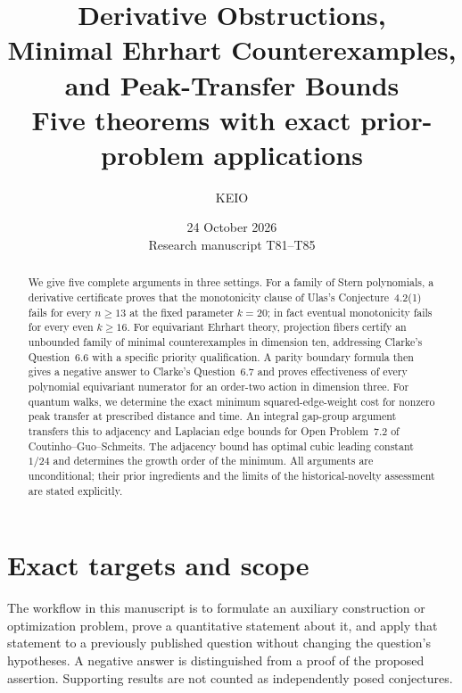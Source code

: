 \documentclass[11pt,a4paper]{article}
\title{Derivative Obstructions,\\Minimal Ehrhart Counterexamples,\\and Peak-Transfer Bounds\\[5pt]\large Five theorems with exact prior-problem applications}
\author{KEIO}
\date{24 October 2026\\[3pt]\small Research manuscript T81--T85}
\theoremstyle{definition}\newtheorem{definition}[lemma]{Definition}
\theoremstyle{remark}\newtheorem{remark}[lemma]{Remark}
\begin{document}
\maketitle
\begin{abstract}
We give five complete arguments in three settings. For a family of Stern
polynomials, a derivative certificate proves that the monotonicity clause
of Ulas's Conjecture~4.2(1) fails for every $n\geq13$ at the fixed parameter
$k=20$; in fact eventual monotonicity fails for every even $k\geq16$.
For equivariant Ehrhart theory, projection fibers certify an unbounded
family of minimal counterexamples in dimension ten, addressing Clarke's
Question~6.6 with a specific priority qualification. A parity boundary
formula then gives a negative answer to Clarke's Question~6.7 and proves
effectiveness of every polynomial equivariant numerator for an order-two
action in dimension three.
For quantum walks, we determine the exact minimum squared-edge-weight
cost for nonzero peak transfer at prescribed distance and time. An integral
gap-group argument transfers this to adjacency and Laplacian edge bounds
for Open Problem~7.2 of Coutinho--Guo--Schmeits. The adjacency bound has
optimal cubic leading constant $1/24$ and determines the growth order of
the minimum. All arguments are unconditional; their prior ingredients and
the limits of the historical-novelty assessment are stated explicitly.
\end{abstract}

\section{Exact targets and scope}

The workflow in this manuscript is to formulate an auxiliary construction
or optimization problem, prove a quantitative statement about it, and apply
that statement to a previously published question without changing the
question's hypotheses. A negative answer is distinguished from a proof of
the proposed assertion. Supporting results are not counted as independently
posed conjectures.
\end{document}
